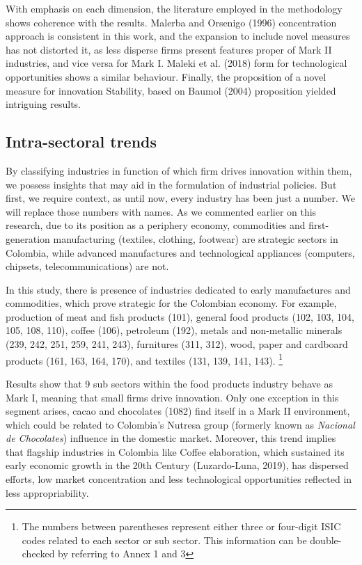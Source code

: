 \documentclass[12pt,a4paper]{article}
\begin{document}
With emphasis on each dimension, the literature employed in the methodology shows coherence with the results. Malerba and Orsenigo (1996) concentration approach is consistent in this work, and the expansion to include novel measures has not distorted it, as less disperse firms present features proper of Mark II industries, and vice versa for Mark I. Maleki et al. (2018) form for technological opportunities shows a similar behaviour. Finally, the proposition of a novel measure for innovation Stability, based on Baumol (2004) proposition yielded intriguing results. 

\subsection{Intra-sectoral trends}

By classifying industries in function of which firm drives innovation within them, we possess insights that may aid in the formulation of industrial policies. But first, we require context, as until now, every industry has been just a number. We will replace those numbers with names. As we commented earlier on this research, due to its position as a periphery economy, commodities and first-generation manufacturing (textiles, clothing, footwear) are strategic sectors in Colombia, while advanced manufactures and technological appliances (computers, chipsets, telecommunications) are not. 

In this study, there is presence of industries dedicated to early manufactures and commodities, which prove strategic for the Colombian economy. For example, production of meat and fish products (101), general food products (102, 103, 104, 105, 108, 110), coffee (106), petroleum (192), metals and non-metallic minerals (239, 242, 251, 259, 241, 243), furnitures (311, 312), wood, paper and cardboard products (161, 163, 164, 170), and textiles (131, 139, 141, 143). \footnote{The numbers between parentheses represent either three or four-digit ISIC codes related to each sector or sub sector. This information can be double-checked by referring to Annex 1 and 3} 

Results show that 9 sub sectors within the food products industry behave as Mark I, meaning that small firms drive innovation. Only one exception in this segment arises, cacao and chocolates (1082) find itself in a Mark II environment, which could be related to Colombia's Nutresa group (formerly known as \textit{Nacional de Chocolates}) influence in the domestic market. Moreover, this trend implies that flagship industries in Colombia like Coffee elaboration, which sustained its early economic growth in the 20th Century (Luzardo-Luna, 2019), has dispersed efforts, low market concentration and less technological opportunities reflected in less appropriability.
\end{document}

